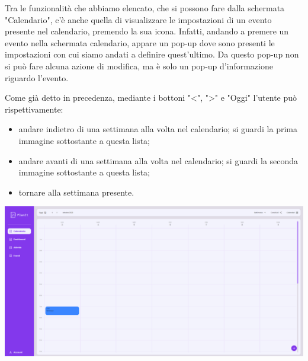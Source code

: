 Tra le funzionalità che abbiamo elencato, che si possono fare dalla schermata "Calendario", c'è anche quella di visualizzare le impostazioni di un evento presente nel calendario, premendo la sua icona. Infatti, andando a premere un evento nella schermata calendario, appare un pop-up dove sono presenti le impostazioni con cui siamo andati a definire quest'ultimo. Da questo pop-up non si può fare alcuna azione di modifica, ma è solo un pop-up d'informazione riguardo l'evento.




Come già detto in precedenza, mediante i bottoni "<", ">" e "Oggi" l'utente può rispettivamente:
\begin{itemize}
    \item andare indietro di una settimana alla volta nel calendario; si guardi la prima immagine sottostante a questa lista;
    \item andare avanti di una settimana alla volta nel calendario; si guardi la seconda immagine sottostante a questa lista;
    \item tornare alla settimana presente.
\end{itemize}


\begin{center}
    \includegraphics[width=1\textwidth, height=0.3\textheight]{img/png/FrontEnd/Calendario/calendario_passato.png}
\end{center}

